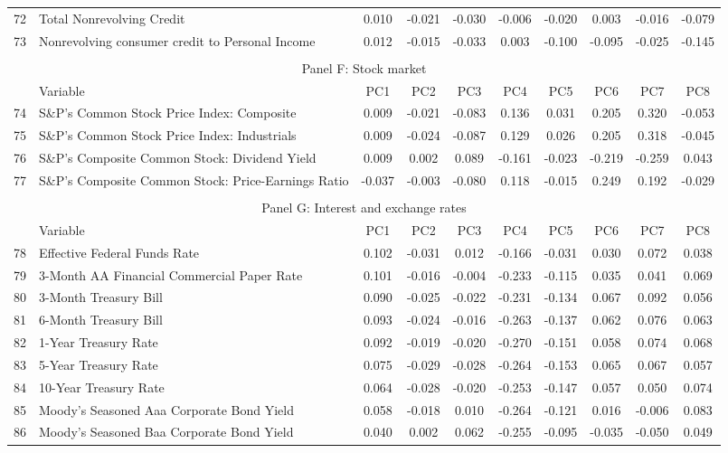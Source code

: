 \begin{table}[!h]
\begin{tabular}{llcccccccc}
72&Total Nonrevolving Credit	&	0.010	&	-0.021	&	-0.030	&	-0.006	&	-0.020	&	0.003	&	-0.016	&	-0.079	\\
73&Nonrevolving consumer credit to Personal Income	&	0.012	&	-0.015	&	-0.033	&	0.003	&	-0.100	&	-0.095	&	-0.025	&	-0.145	\\
\\ \hline
 \multicolumn{10}{c}{Panel F: Stock market} \\ 
&Variable&	PC1	&	PC2	&	PC3	&	PC4	&	PC5	&	PC6	&	PC7	&	PC8	\\ \hline
74&S\&P’s Common Stock Price Index: Composite	&	0.009	&	-0.021	&	-0.083	&	0.136	&	0.031	&	0.205	&	0.320	&	-0.053	\\
75&S\&P’s Common Stock Price Index: Industrials	&	0.009	&	-0.024	&	-0.087	&	0.129	&	0.026	&	0.205	&	0.318	&	-0.045	\\
76&S\&P’s Composite Common Stock: Dividend Yield	&	0.009	&	0.002	&	0.089	&	-0.161	&	-0.023	&	-0.219	&	-0.259	&	0.043	\\
77&S\&P’s Composite Common Stock: Price-Earnings Ratio	&	-0.037	&	-0.003	&	-0.080	&	0.118	&	-0.015	&	0.249	&	0.192	&	-0.029	\\
\\ \hline
 \multicolumn{10}{c}{Panel G: Interest and exchange rates} \\ 
&Variable&	PC1	&	PC2	&	PC3	&	PC4	&	PC5	&	PC6	&	PC7	&	PC8	\\ \hline
78&Effective Federal Funds Rate	&	0.102	&	-0.031	&	0.012	&	-0.166	&	-0.031	&	0.030	&	0.072	&	0.038	\\
79&3-Month AA Financial Commercial Paper Rate	&	0.101	&	-0.016	&	-0.004	&	-0.233	&	-0.115	&	0.035	&	0.041	&	0.069	\\
80&3-Month Treasury Bill	&	0.090	&	-0.025	&	-0.022	&	-0.231	&	-0.134	&	0.067	&	0.092	&	0.056	\\
81&6-Month Treasury Bill	&	0.093	&	-0.024	&	-0.016	&	-0.263	&	-0.137	&	0.062	&	0.076	&	0.063	\\
82&1-Year Treasury Rate	&	0.092	&	-0.019	&	-0.020	&	-0.270	&	-0.151	&	0.058	&	0.074	&	0.068	\\
83&5-Year Treasury Rate	&	0.075	&	-0.029	&	-0.028	&	-0.264	&	-0.153	&	0.065	&	0.067	&	0.057	\\
84&10-Year Treasury Rate	&	0.064	&	-0.028	&	-0.020	&	-0.253	&	-0.147	&	0.057	&	0.050	&	0.074	\\
85&Moody’s Seasoned Aaa Corporate Bond Yield	&	0.058	&	-0.018	&	0.010	&	-0.264	&	-0.121	&	0.016	&	-0.006	&	0.083	\\
86&Moody’s Seasoned Baa Corporate Bond Yield	&	0.040	&	0.002	&	0.062	&	-0.255	&	-0.095	&	-0.035	&	-0.050	&	0.049	\\

\end{tabular}
\end{table}
